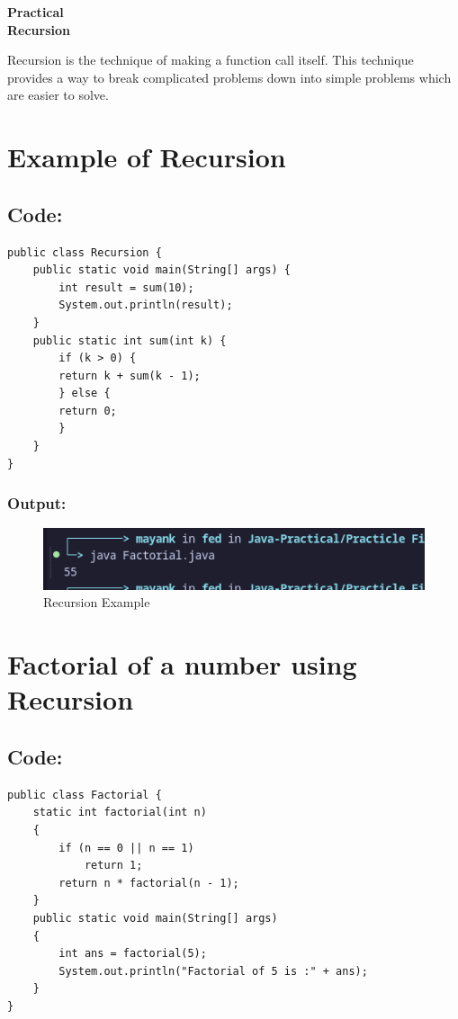 \documentclass[a4paper,12pt]{article}
\newcounter{practicalno} %
\newcommand{\practicaltitle}[1]{
    \stepcounter{practicalno} %
    \newpage
    \begin{center}
        \vspace{1cm}
        \Large\textbf{Practical \thepracticalno} \\
        \vspace{0.5cm}
        \Large\textbf{#1} %
        \normalsize\vspace{1cm}
    \end{center}
}
\begin{document}
\setcounter{section}{0}

\practicaltitle{Recursion}
Recursion is the technique of making a function call itself. This technique provides a way to break complicated problems down into simple problems which are easier to solve.

\section{Example of Recursion}
\subsection{Code: }
\begin{lstlisting}
public class Recursion {
    public static void main(String[] args) {
        int result = sum(10);
        System.out.println(result);
    }
    public static int sum(int k) {
        if (k > 0) {
        return k + sum(k - 1);
        } else {
        return 0;
        }
    }
}
\end{lstlisting}
\subsubsection{Output: }
\begin{figure}[H]
    \centering
    \includegraphics[width=0.9\linewidth]{images/RecExp.png}
    \caption{Recursion Example}
    \label{fig:sample_image}
\end{figure}

\section{Factorial of a number using Recursion}
\subsection{Code: }
\begin{lstlisting}
public class Factorial {
    static int factorial(int n)
    {
        if (n == 0 || n == 1)
            return 1;
        return n * factorial(n - 1);
    }
    public static void main(String[] args)
    {
        int ans = factorial(5);
        System.out.println("Factorial of 5 is :" + ans);
    }
}   
\end{lstlisting}
\end{document}
